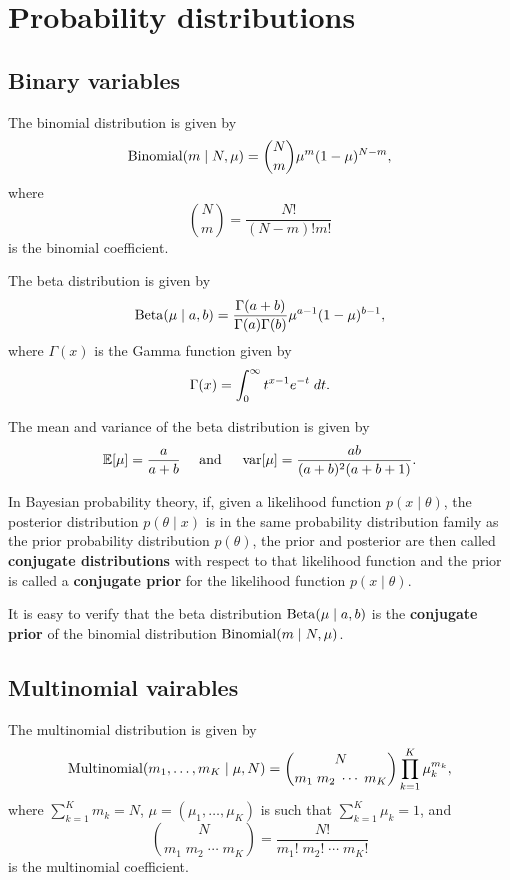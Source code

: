 \documentclass[a4paper]{article}
\begin{document}
\section{Probability distributions}

\subsection{Binary variables}

\begin{defi}
The binomial distribution is given by 
\[
\operatorname{Binomial}(m \mid N, \mu) 
= \binom{N}{m} \mu^{m} (1 - \mu)^{N - m},
\]
where 
\[
\binom{N}{m} = \frac{N!}{(N - m)! m!} 
\]
is the binomial coefficient.
\end{defi}

\begin{defi}
The beta distribution is given by 
\[
\operatorname{Beta}(\mu \mid a, b) 
= \frac{\Gamma(a + b)}{\Gamma(a) \Gamma(b)}
\mu^{a - 1} (1 - \mu)^{b - 1},
\]
where $\Gamma(x)$ is the Gamma function given by 
\[
\Gamma(x) = \int_0^\infty t^{x - 1} e^{-t} \; d t.
\]
\end{defi}
The mean and variance of the beta distribution is given 
by 
\[
\begin{aligned}
\mathbb{E}[\mu] = \frac{a}{a + b}
\quad \text{ and } \quad
\operatorname{var}[\mu] = \frac{ab}{(a + b)^2 (a + b + 1)}.
\end{aligned}
\]

\begin{defi}
In Bayesian probability theory, if, given a likelihood 
function $p(x \mid \theta)$, the posterior distribution 
$p(\theta \mid x)$ is in the same probability distribution 
family as the prior probability distribution 
$p(\theta)$, the prior and posterior are then called 
\textbf{conjugate distributions} with respect to that 
likelihood function and the prior is called a \textbf{conjugate 
prior} for the likelihood function $p(x \mid \theta)$. 
\end{defi}

It is easy to verify that the beta distribution $\operatorname{Beta}
(\mu \mid a, b)$ is  
the \textbf{conjugate prior} of the binomial distribution
$\operatorname{Binomial}(m \mid N, \mu)$.

\subsection{Multinomial vairables}

\begin{defi}
The multinomial distribution is given by 
\[
\operatorname{Multinomial}(m_1, \dots, m_K \mid \mu, N)
= \binom{N}{m_1 \; m_2 \; \cdots \; m_K} 
\prod_{k=1}^K \mu_k^{m_k},
\]
where $\sum_{k=1}^K m_k = N$, 
$\mu = (\mu_1, \dots, \mu_K)$ is such that 
$\sum_{k=1}^K \mu_k = 1$, and 
\[
\binom{N}{m_1 \; m_2 \; \cdots \; m_K}
= \frac{N!}{m_1! \; m_2! \; \cdots \; m_K!}
\]
is the multinomial coefficient.
\end{defi}
\end{document}

